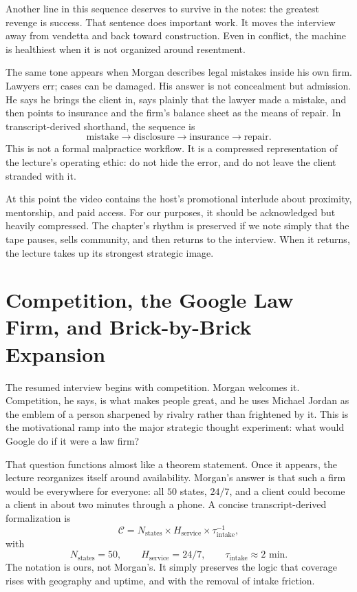 Another line in this sequence deserves to survive in the notes: the greatest revenge is success. That sentence does important work. It moves the interview away from vendetta and back toward construction. Even in conflict, the machine is healthiest when it is not organized around resentment.

The same tone appears when Morgan describes legal mistakes inside his own firm. Lawyers err; cases can be damaged. His answer is not concealment but admission. He says he brings the client in, says plainly that the lawyer made a mistake, and then points to insurance and the firm's balance sheet as the means of repair. In transcript-derived shorthand, the sequence is
\begin{equation}
\text{mistake} \to \text{disclosure} \to \text{insurance} \to \text{repair}.
\end{equation}
This is not a formal malpractice workflow. It is a compressed representation of the lecture's operating ethic: do not hide the error, and do not leave the client stranded with it.

At this point the video contains the host's promotional interlude about proximity, mentorship, and paid access. For our purposes, it should be acknowledged but heavily compressed. The chapter's rhythm is preserved if we note simply that the tape pauses, sells community, and then returns to the interview. When it returns, the lecture takes up its strongest strategic image.

\section{Competition, the Google Law Firm, and Brick-by-Brick Expansion}

The resumed interview begins with competition. Morgan welcomes it. Competition, he says, is what makes people great, and he uses Michael Jordan as the emblem of a person sharpened by rivalry rather than frightened by it. This is the motivational ramp into the major strategic thought experiment: what would Google do if it were a law firm?

That question functions almost like a theorem statement. Once it appears, the lecture reorganizes itself around availability. Morgan's answer is that such a firm would be everywhere for everyone: all \(50\) states, \(24/7\), and a client could become a client in about two minutes through a phone. A concise transcript-derived formalization is
\begin{equation}
\mathcal{C} = N_{\mathrm{states}} \times H_{\mathrm{service}} \times \tau_{\mathrm{intake}}^{-1},
\end{equation}
with
\begin{equation}
N_{\mathrm{states}} = 50, \qquad H_{\mathrm{service}} = 24/7, \qquad \tau_{\mathrm{intake}} \approx 2 \text{ min}.
\end{equation}
The notation is ours, not Morgan's. It simply preserves the logic that coverage rises with geography and uptime, and with the removal of intake friction.

